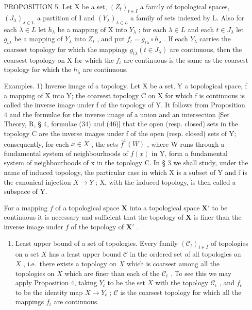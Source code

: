 PROPOSITION 5. Let X be a set, \((Z_{t})_{t\in I}\) a family of topological spaces, \((J_{\lambda})_{\lambda\in L}\) a partition of I and \((Y_{\lambda})_{\lambda\in L}\) a family of sets indexed by L. Also for each \(\lambda\in L\) let \(h_{\lambda}\) be a mapping of X into \(Y_{\lambda}\) ; for each \(\lambda\in L\) and each \(t\in J_{\lambda}\) let \(g_{t\lambda}\) be a mapping of \(Y_{\lambda}\) into \(Z_{t}\) , and put \(f_{t}=g_{t\lambda}\circ h_{\lambda}\) . If each \(Y_{\lambda}\) carries the coarsest topology for which the mappings \(g_{t\lambda}(t\in J_{\lambda})\) are continuous, then the coarsest topology on X for which the \(f_{t}\) are continuous is the same as the coarsest topology for which the \(h_{\lambda}\) are continuous.

Examples. 1) Inverse image of a topology. Let X be a set, Y a topological space, f a mapping of X into Y; the coarsest topology C on X for which f is continuous is called the inverse image under f of the topology of Y. It follows from Proposition 4 and the formulae for the inverse image of a union and an intersection {[}Set Theory, R, § 4, formulae (34) and (46){]} that the open (resp. closed) sets in the topology C are the inverse images under f of the open (resp. closed) sets of Y; consequently, for each \(x \in X\) , the sets \(\overline{f}^{1}(W)\) , where W runs through a fundamental system of neighbourhoods of \(f(x)\) in Y, form a fundamental system of neighbourhoods of x in the topology C. In § 3 we shall study, under the name of induced topology, the particular case in which X is a subset of Y and f is the canonical injection \(X \to Y\) ; X, with the induced topology, is then called a subspace of Y.

For a mapping \(f\) of a topological space \(\mathbf{X}\) into a topological space \(\mathbf{X}'\) to be continuous it is necessary and sufficient that the topology of \(\mathbf{X}\) is finer than the inverse image under \(f\) of the topology of \(\mathbf{X}'\) .

\begin{enumerate}
\def\labelenumi{\arabic{enumi})}
\setcounter{enumi}{1}
\tightlist
\item
  Least upper bound of a set of topologies. Every family \((\mathcal{C}_t)_{i\in I}\) of topologies on a set \(X\) has a least upper bound \(\mathcal{C}\) in the ordered set of all topologies on \(X\) , i.e.~there exists a topology on \(X\) which is coarsest among all the topologies on \(X\) which are finer than each of the \(\mathcal{C}_t\) . To see this we may apply Proposition 4, taking \(Y_t\) to be the set \(X\) with the topology \(\mathcal{C}_t\) , and \(f_t\) to be the identity map \(X\to Y_t\) ; \(\mathcal{C}\) is the coarsest topology for which all the mappings \(f_t\) are continuous.
\end{enumerate}


